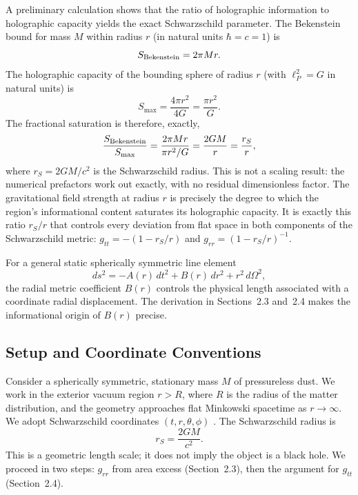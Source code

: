 \documentclass[12pt]{article}
\begin{document}
A preliminary calculation shows that the ratio of holographic
information to holographic capacity yields the exact Schwarzschild
parameter.
The Bekenstein bound for mass $M$ within radius $r$ (in natural units
$\hbar = c = 1$) is
\begin{equation*}
  S_{\rm Bekenstein} = 2\pi Mr.
\end{equation*}
The holographic capacity of the bounding sphere of radius $r$
(with $\ell_P^2 = G$ in natural units) is
\begin{equation*}
  S_{\max} = \frac{4\pi r^2}{4G} = \frac{\pi r^2}{G}.
\end{equation*}
The fractional saturation is therefore, exactly,
\begin{equation*}
  \frac{S_{\rm Bekenstein}}{S_{\max}}
  = \frac{2\pi Mr}{\pi r^2/G}
  = \frac{2GM}{r}
  = \frac{r_S}{r},
\end{equation*}
where $r_S = 2GM/c^2$ is the Schwarzschild radius.
This is not a scaling result: the numerical prefactors work out
exactly, with no residual dimensionless factor.
The gravitational field strength at radius $r$ is precisely the
degree to which the region's informational content saturates its
holographic capacity.
It is exactly this ratio $r_S/r$ that controls every deviation from
flat space in both components of the Schwarzschild metric:
$g_{tt} = -(1 - r_S/r)$ and $g_{rr} = (1 - r_S/r)^{-1}$.

For a general static spherically symmetric line element
\cite{Wald1984}
\begin{equation}
  ds^2 = -A(r)\,dt^2 + B(r)\,dr^2 + r^2\,d\Omega^2,
  \label{eq:general-metric}
\end{equation}
the radial metric coefficient $B(r)$ controls the physical length
associated with a coordinate radial displacement.
The derivation in Sections~2.3 and~2.4 makes the informational
origin of $B(r)$ precise.

\subsection{Setup and Coordinate Conventions}
\label{sec:setup}

Consider a spherically symmetric, stationary mass $M$ of pressureless
dust.
We work in the exterior vacuum region $r > R$, where $R$ is the radius
of the matter distribution, and the geometry approaches flat Minkowski
spacetime as $r \to \infty$.
We adopt Schwarzschild coordinates $(t, r, \theta, \phi)$ \cite{Wald1984}.
The Schwarzschild radius is
\begin{equation}
  r_S = \frac{2GM}{c^2}.
  \label{eq:rs}
\end{equation}
This is a geometric length scale; it does not imply the object is a
black hole.
We proceed in two steps: $g_{rr}$ from area excess (Section~2.3),
then the argument for $g_{tt}$ (Section~2.4).
\end{document}
